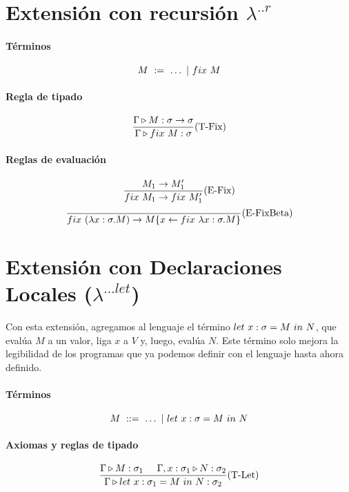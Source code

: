 \documentclass[10pt,a4paper]{article}
\begin{document}
\newpage
\section{Extensión con recursión $\lambda^{..r}$}
\paragraph{Términos}
$$M~:=~\dots~|~fix~M$$

\paragraph{Regla de tipado}
\begin{equation*}
    \frac{\Gamma\triangleright M : \sigma\to\sigma}{\Gamma\triangleright fix~M : \sigma}(\text{T-Fix})
\end{equation*}

\paragraph{Reglas de evaluación}
\begin{equation*}
    \frac{M_1\to M'_1}{fix~M_1\to fix~M'_1}(\text{E-Fix})
\end{equation*}
\vspace*{5mm}
\begin{equation*}
\frac{}{fix~(\lambda x: \sigma . M)\to M\{x\leftarrow fix~\lambda x: \sigma . M\}}(\text{E-FixBeta})
\end{equation*}

\section{Extensión con Declaraciones Locales (\texorpdfstring{$\lambda^{...let}$}{lambda ...let})}\label{extension_lambda:let}

Con esta extensión, agregamos al lenguaje el término $let~x:\sigma = M~in~N$, que evalúa $M$ a un valor, liga $x$ a $V$ y, luego, evalúa $N$. Este término solo mejora la legibilidad de los programas que ya podemos definir con el lenguaje hasta ahora definido.

\paragraph{Términos}
$$ M~::=~ \dots~|~let~x:\sigma = M~in~N $$


\paragraph{Axiomas y reglas de tipado}
\begin{equation*}
\frac{\Gamma\triangleright M : \sigma_1\hspace*{5mm}\Gamma,x:\sigma_1\triangleright N : \sigma_2}{\Gamma\triangleright let~x:\sigma_1 = M~in~N : \sigma_2}(\text{T-Let})
\end{equation*}
\end{document}
